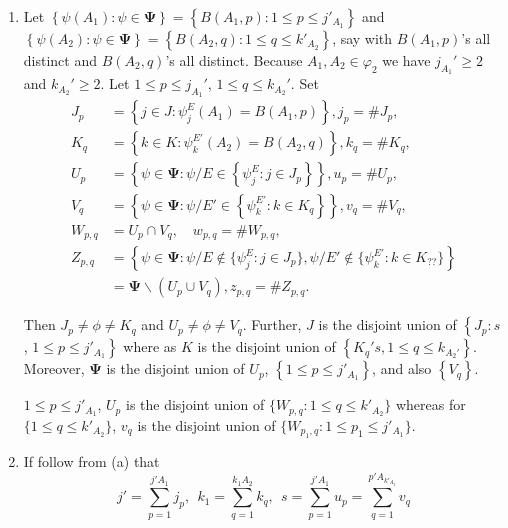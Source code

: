 \documentclass[a4paper,12pt]{article}
\theoremstyle{definition}
\theoremstyle{underlinethm}
\theoremstyle{definition}
\begin{document}
\begin{enumerate}[label=(\alph*)]
\item Let $\left\{\psi(A_{1}) : \psi \in \boldsymbol{\Psi}\right\} = \left\{B(A_{1}, p) : 1 \leq p \leq j'_{A_{1}}\right\}$ and $\left\{\psi (A_{2}) : \psi \in \boldsymbol{\Psi}\right\} = \left\{B(A_{2}, q) : 1 \leq q \leq k'_{A_{2}}\right\}$, say with $B(A_{1}, p)$'s all distinct and $B(A_{2}, q)$'s all distinct. Because $A_{1}, A_{2} \in \varphi_{2}$ we have $j_{A_{1}}' \geq 2$ and $k_{A_{2}}' \geq 2$. Let $1 \leq p \leq j_{A_{1}}'$, $1 \leq q \leq k_{A_{2}}'$. Set 
\begin{align*}
J_{p} &= \left\{j \in J  : \psi_{j}^{E} (A_{1}) = B(A_{1}, p)\right\}, j_{p} = \# J_{p},\\
K_{q} & = \left\{k \in K : \psi_{k}^{E'} (A_{2}) = B(A_{2}, q)\right\}, k_{q} = \# K_{q},\\
U_{p} & = \left\{\psi \in \boldsymbol{\Psi} : \psi / E \in \left\{\psi_{j}^{E} : j \in J_{p}\right\}\right\}, u_{p} = \# U_{p},\\
V_{q} & = \left\{\psi \in \boldsymbol{\Psi} : \psi/E' \in \left\{\psi_{k}^{E'} : k \in K_{q}\right\} \right\}, v_{q} = \# V_{q},\\
W_{p,q} & = U_{p} \cap V_{q},\quad w_{p, q} = \# W_{p,q},\\
Z_{p,q} & = \left\{\psi \in \boldsymbol{\Psi} : \psi /E \notin \{ \psi_{j}^{E} : j \in J_{p}\}, \psi/E' \notin \{\psi_{k}^{E'} : k \in K_{??}\} \right\}\\
 & = \boldsymbol{\Psi} \smallsetminus (U_{p} \cup V_{q}), z_{p,q} = \# Z_{p,q}.
\end{align*}

Then $J_{p} \neq \phi \neq K_{q}$ and $U_{p} \neq \phi \neq V_{q}$. Further, $J$ is the disjoint union of $\left\{J_{p} : s\right.$, $\left.1 \leq p \leq j'_{A_{1}}\right\}$ where as $K$ is the disjoint union of $\left\{K_{q}'s, 1 \leq q \leq k_{A_{2}'}\right\}$. Moreover, $\boldsymbol{\Psi}$ is the disjoint union of $U_{p} $, $\left\{1 \leq p \leq j'_{A_{1}}\right\}$, and also $\left\{V_{q}\right\}$.

$1 \leq p \leq j'_{A_{1}}$, $U_{p}$ is the disjoint union of $\{W_{p,q} : 1 \leq q \leq k'_{A_{2}} \}$ whereas for $\{1 \leq q \leq k'_{A_{2}}\}$, $v_{q}$ is the disjoint union of $\{W_{p_{1},q} : 1 \leq p_{1} \leq j'_{A_{1}}\}$.

\item If follow from (a) that 
\begin{equation}
j' = \sum_{p=1}^{j'A_{1}} j_{p}, ~~ k_{1} = \sum_{q=1}^{k_{1}A_{2}} k_{q},~~ s= \sum_{p=1}^{j'A_{1}} u_{p}= \sum_{q=1}^{p'A_{k'_{A_{2}}}}v_{q}\tag{3.62}\label{eq-3.62}
\end{equation}


\end{enumerate}
\end{document}
